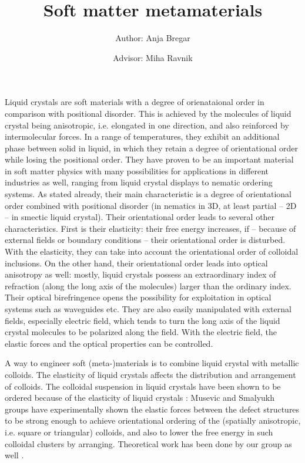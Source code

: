 \documentclass[a4paper,11pt]{article}
\title{\huge{Soft matter metamaterials}}
\author{Author: Anja Bregar \and Advisor: Miha Ravnik}
\begin{document}
\onehalfspacing

\maketitle

% 
% 
% 
%



Liquid crystals are soft materials with a degree of orienataional order in comparison with positional disorder. 
This is achieved by the molecules of liquid crystal being anisotropic, i.e. elongated in one direction, and also reinforced by intermolecular forces.  
In a range of temperatures, they exhibit an additional phase between solid in liquid, in which they retain a degree of orientational order while losing the positional order. 
They have proven to be an important material in soft matter physics with many possibilities for applications in different industries as well, ranging from liquid crystal displays to nematic ordering systems. 
As stated already, their main characteristic is a degree of orientational order combined with positional disorder (in nematics in 3D, at least partial -- 2D -- in smectic liquid crystal). 
Their orientational order leads to several other characteristics. 
First is their elasticity: their free energy increases, if -- because of external fields or boundary conditions -- their orientational order is disturbed. 
With the elasticity, they can take into account the orientational order of colloidal inclusions. 
On the other hand, their orientational order leads into optical anisotropy as well: mostly, liquid crystals possess an extraordinary index of refraction (along the long axis of the molecules) larger than the ordinary index. 
Their optical birefringence opens the possibility for exploitation in optical systems such as waveguides etc. 
They are also easily manipulated with external fields, especially electric field, which tends to turn the long axis of the liquid crystal molecules to be polarized along the field. 
With the electric field, the elastic forces and the optical properties can be controlled. 

A way to engineer soft (meta-)materials is to combine liquid crystal with metallic colloids. 
The elasticity of liquid crystals affects the distribution and arrangement of colloids. 
The colloidal suspension in liquid crystals have been shown to be ordered because of the elasticity of liquid crystals \cite{1, 2, 3,}: 
Musevic and Smalyukh groups have experimentally shown the elastic forces between the defect structures to be strong enough to achieve orientational ordering of the (spatially anisotropic, i.e. square or triangular) colloids, and also to lower the free energy in such colloidal clusters by arranging. 
Theoretical work has been done by our group as well \cite{cc}. 
\end{document}
